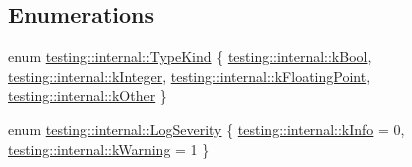 \subsection*{Enumerations}
\begin{DoxyCompactItemize}
\item 
enum \hyperlink{namespacetesting_1_1internal_aa8747bda20137c9aa7f846dee830e686}{testing\+::internal\+::\+Type\+Kind} \{ \hyperlink{namespacetesting_1_1internal_aa8747bda20137c9aa7f846dee830e686a3af2191917fb1796599139b3615302fe}{testing\+::internal\+::k\+Bool}, 
\hyperlink{namespacetesting_1_1internal_aa8747bda20137c9aa7f846dee830e686a8a52f0fd73e05da35c45d80653633cab}{testing\+::internal\+::k\+Integer}, 
\hyperlink{namespacetesting_1_1internal_aa8747bda20137c9aa7f846dee830e686acdce59b8c136926ace18aa9c2995878d}{testing\+::internal\+::k\+Floating\+Point}, 
\hyperlink{namespacetesting_1_1internal_aa8747bda20137c9aa7f846dee830e686ad47f29150ab7a9ec8ce2491f44537347}{testing\+::internal\+::k\+Other}
 \}
\item 
enum \hyperlink{namespacetesting_1_1internal_a203d1a8a2147a53d12bbdae40d443914}{testing\+::internal\+::\+Log\+Severity} \{ \hyperlink{namespacetesting_1_1internal_a203d1a8a2147a53d12bbdae40d443914a396aacfaee2849eaab7c1de9773d624d}{testing\+::internal\+::k\+Info} = 0, 
\hyperlink{namespacetesting_1_1internal_a203d1a8a2147a53d12bbdae40d443914a5beeeab1b0a3caabd0afb43356c1a271}{testing\+::internal\+::k\+Warning} = 1
 \}
\end{DoxyCompactItemize}
